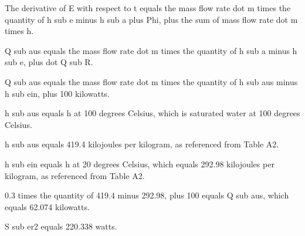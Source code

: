 The derivative of E with respect to t equals the mass flow rate dot m times the quantity of h sub e minus h sub a plus Phi, plus the sum of mass flow rate dot m times h.

Q sub aus equals the mass flow rate dot m times the quantity of h sub a minus h sub e, plus dot Q sub R.

Q sub aus equals the mass flow rate dot m times the quantity of h sub aus minus h sub ein, plus 100 kilowatts.

h sub aus equals h at 100 degrees Celsius, which is saturated water at 100 degrees Celsius.

h sub aus equals 419.4 kilojoules per kilogram, as referenced from Table A2.

h sub ein equals h at 20 degrees Celsius, which equals 292.98 kilojoules per kilogram, as referenced from Table A2.

0.3 times the quantity of 419.4 minus 292.98, plus 100 equals Q sub aus, which equals 62.074 kilowatts.

S sub er2 equals 220.338 watts.